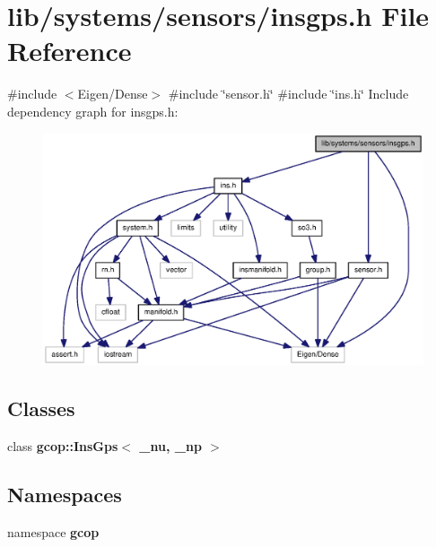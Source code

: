 \section{lib/systems/sensors/insgps.h \-File \-Reference}
\label{insgps_8h}
{\ttfamily \#include $<$\-Eigen/\-Dense$>$}\*
{\ttfamily \#include \char`\"{}sensor.\-h\char`\"{}}\*
{\ttfamily \#include \char`\"{}ins.\-h\char`\"{}}\*
\-Include dependency graph for insgps.\-h\-:\nopagebreak
\begin{figure}[H]
\begin{center}
\leavevmode
\includegraphics[width=350pt]{insgps_8h__incl}
\end{center}
\end{figure}
\subsection*{\-Classes}
\begin{DoxyCompactItemize}
\item 
class {\bf gcop\-::\-Ins\-Gps$<$ \-\_\-nu, \-\_\-np $>$}
\end{DoxyCompactItemize}
\subsection*{\-Namespaces}
\begin{DoxyCompactItemize}
\item 
namespace {\bf gcop}
\end{DoxyCompactItemize}
